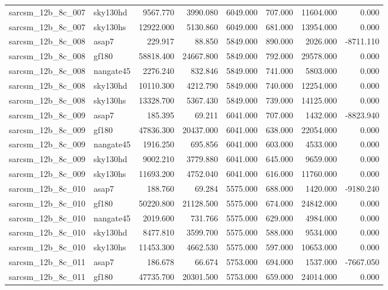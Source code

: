\begin{tabular}{llrrrrrr}
sarcsm\_12b\_8c\_007 & sky130hd & 9567.770 & 3990.080 & 6049.000 & 707.000 & 11604.000 & 0.000 \\
sarcsm\_12b\_8c\_007 & sky130hs & 12922.000 & 5130.860 & 6049.000 & 681.000 & 13954.000 & 0.000 \\
sarcsm\_12b\_8c\_008 & asap7 & 229.917 & 88.850 & 5849.000 & 890.000 & 2026.000 & -8711.110 \\
sarcsm\_12b\_8c\_008 & gf180 & 58818.400 & 24667.800 & 5849.000 & 792.000 & 29578.000 & 0.000 \\
sarcsm\_12b\_8c\_008 & nangate45 & 2276.240 & 832.846 & 5849.000 & 741.000 & 5803.000 & 0.000 \\
sarcsm\_12b\_8c\_008 & sky130hd & 10110.300 & 4212.790 & 5849.000 & 740.000 & 12254.000 & 0.000 \\
sarcsm\_12b\_8c\_008 & sky130hs & 13328.700 & 5367.430 & 5849.000 & 739.000 & 14125.000 & 0.000 \\
sarcsm\_12b\_8c\_009 & asap7 & 185.395 & 69.211 & 6041.000 & 707.000 & 1432.000 & -8823.940 \\
sarcsm\_12b\_8c\_009 & gf180 & 47836.300 & 20437.000 & 6041.000 & 638.000 & 22054.000 & 0.000 \\
sarcsm\_12b\_8c\_009 & nangate45 & 1916.250 & 695.856 & 6041.000 & 603.000 & 4533.000 & 0.000 \\
sarcsm\_12b\_8c\_009 & sky130hd & 9002.210 & 3779.880 & 6041.000 & 645.000 & 9659.000 & 0.000 \\
sarcsm\_12b\_8c\_009 & sky130hs & 11693.200 & 4752.040 & 6041.000 & 616.000 & 11760.000 & 0.000 \\
sarcsm\_12b\_8c\_010 & asap7 & 188.760 & 69.284 & 5575.000 & 688.000 & 1420.000 & -9180.240 \\
sarcsm\_12b\_8c\_010 & gf180 & 50220.800 & 21128.500 & 5575.000 & 674.000 & 24842.000 & 0.000 \\
sarcsm\_12b\_8c\_010 & nangate45 & 2019.600 & 731.766 & 5575.000 & 629.000 & 4984.000 & 0.000 \\
sarcsm\_12b\_8c\_010 & sky130hd & 8477.810 & 3599.700 & 5575.000 & 588.000 & 9534.000 & 0.000 \\
sarcsm\_12b\_8c\_010 & sky130hs & 11453.300 & 4662.530 & 5575.000 & 597.000 & 10653.000 & 0.000 \\
sarcsm\_12b\_8c\_011 & asap7 & 186.678 & 66.674 & 5753.000 & 694.000 & 1537.000 & -7667.050 \\
sarcsm\_12b\_8c\_011 & gf180 & 47735.700 & 20301.500 & 5753.000 & 659.000 & 24014.000 & 0.000 \\

\end{tabular}
